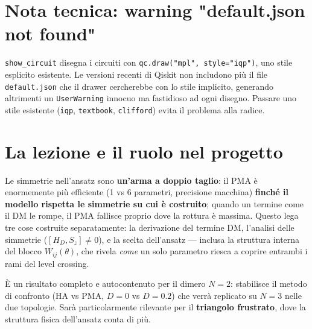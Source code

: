\documentclass[11pt,a4paper]{article}
\begin{document}
\section*{Nota tecnica: warning "default.json not found"}

\texttt{show\_circuit} disegna i circuiti con
\texttt{qc.draw("mpl", style="iqp")}, uno stile esplicito esistente. Le
versioni recenti di Qiskit non includono più il file
\texttt{default.json} che il drawer cercherebbe con lo stile implicito,
generando altrimenti un \texttt{UserWarning} innocuo ma fastidioso ad
ogni disegno. Passare uno stile esistente (\texttt{iqp},
\texttt{textbook}, \texttt{clifford}) evita il problema alla radice.

\section*{La lezione e il ruolo nel progetto}

Le simmetrie nell'ansatz sono \textbf{un'arma a doppio taglio}: il PMA è
enormemente più efficiente (1 vs 6 parametri, precisione macchina)
\textbf{finché il modello rispetta le simmetrie su cui è costruito};
quando un termine come il DM le rompe, il PMA fallisce proprio dove la
rottura è massima. Questo lega tre cose costruite separatamente: la
derivazione del termine DM, l'analisi delle simmetrie
($[H_D,S_z]\neq0$), e la scelta dell'ansatz --- inclusa la struttura
interna del blocco $W_{ij}(\theta)$, che rivela \emph{come} un solo
parametro riesca a coprire entrambi i rami del level crossing.

È un risultato completo e autocontenuto per il dimero $N=2$: stabilisce
il metodo di confronto (HA vs PMA, $D=0$ vs $D=0.2$) che verrà
replicato su $N=3$ nelle due topologie. Sarà particolarmente rilevante
per il \textbf{triangolo frustrato}, dove la struttura fisica
dell'ansatz conta di più.
\end{document}
